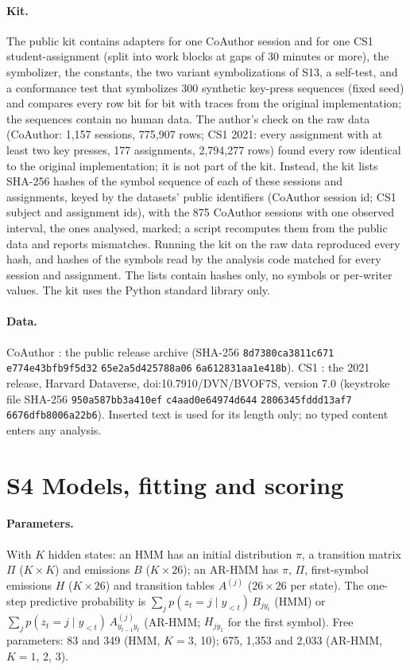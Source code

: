 \documentclass[10pt]{article}
\newcommand{\Ssec}[2]{\section*{S#1\texorpdfstring{\quad}{ } #2}\addcontentsline{toc}{section}{S#1\texorpdfstring{\quad}{ } #2}\label{S#1}}
\begin{document}
\paragraph{Kit.} The public kit contains adapters for one CoAuthor session and for one CS1 student-assignment (split into work blocks at gaps of 30 minutes or more), the symbolizer, the constants, the two variant symbolizations of S13, a self-test, and a conformance test that symbolizes 300 synthetic key-press sequences (fixed seed) and compares every row bit for bit with traces from the original implementation; the sequences contain no human data. The author's check on the raw data (CoAuthor: 1,157 sessions, 775,907 rows; CS1 2021: every assignment with at least two key presses, 177 assignments, 2,794,277 rows) found every row identical to the original implementation; it is not part of the kit. Instead, the kit lists SHA-256 hashes of the symbol sequence of each of these sessions and assignments, keyed by the datasets' public identifiers (CoAuthor session id; CS1 subject and assignment ids), with the 875 CoAuthor sessions with one observed interval, the ones analysed, marked; a script recomputes them from the public data and reports mismatches. Running the kit on the raw data reproduced every hash, and hashes of the symbols read by the analysis code matched for every session and assignment. The lists contain hashes only, no symbols or per-writer values. The kit uses the Python standard library only.

\paragraph{Data.} CoAuthor \citep{Lee2022}: the public release archive (SHA-256 \texttt{8d7380ca3811c671} \texttt{e774e43bfb9f5d32} \texttt{65e2a5d425788a06} \texttt{6a612831aa1e418b}). CS1 \citep{Edwards2023}: the 2021 release, Harvard Dataverse, doi:10.7910/DVN/BVOF7S, version 7.0 (keystroke file SHA-256 \texttt{950a587bb3a410ef} \texttt{c4aad0e64974d644} \texttt{2806345fddd13af7} \texttt{6676dfb8006a22b6}). Inserted text is used for its length only; no typed content enters any analysis.

\Ssec{4}{Models, fitting and scoring}

\paragraph{Parameters.} With $K$ hidden states: an HMM has an initial distribution $\pi$, a transition matrix $\Pi$ ($K\times K$) and emissions $B$ ($K\times26$); an AR-HMM has $\pi$, $\Pi$, first-symbol emissions $H$ ($K\times26$) and transition tables $A^{(j)}$ ($26\times26$ per state). The one-step predictive probability is $\sum_j p(z_t=j\mid y_{<t})\,B_{j y_t}$ (HMM) or $\sum_j p(z_t=j\mid y_{<t})\,A^{(j)}_{y_{t-1}y_t}$ (AR-HMM; $H_{j y_1}$ for the first symbol). Free parameters: 83 and 349 (HMM, $K=3$, 10); 675, 1,353 and 2,033 (AR-HMM, $K=1$, 2, 3).
\end{document}
